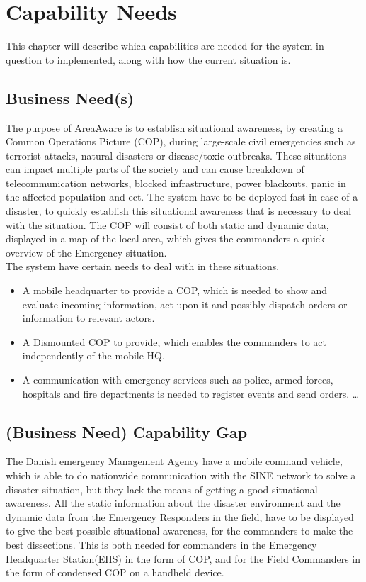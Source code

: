 \chapter{Capability Needs}
\label{chp_need}

This chapter will describe which capabilities are needed for the system in question to implemented, along with how the current situation is.

\section{Business Need(s)}

The purpose of AreaAware is to establish situational awareness, by creating a Common Operations Picture (COP), during large-scale civil emergencies such as terrorist attacks, natural disasters or disease/toxic outbreaks. These situations can impact multiple parts of the society and can cause breakdown of telecommunication networks, blocked infrastructure, power blackouts, panic in the affected population and ect. The system have to be deployed fast in case of a disaster, to quickly establish this situational awareness that is necessary to deal with the situation. The COP will consist of both static and dynamic data, displayed in a map of the local area, which gives the commanders a quick overview of the Emergency situation. \\

The system have certain needs to deal with in these situations.

\begin{itemize}
  \item A mobile headquarter to provide a COP, which is needed to show and evaluate incoming information, act upon it and possibly dispatch orders or information to relevant actors.
  \item A Dismounted COP to provide, which enables the commanders to act independently of the mobile HQ.
  \item A communication with emergency services such as police, armed forces, hospitals and fire departments is needed to register events and send orders. \ldots
\end{itemize}

\section{(Business Need) Capability Gap}

The Danish emergency Management Agency have a mobile command vehicle, which is able to do nationwide communication with the SINE network to solve a disaster situation, but they lack the means of getting a good situational awareness. All the static information about the disaster environment and the dynamic data from the Emergency Responders in the field, have to be displayed to give the best possible situational awareness, for the commanders to make the best dissections. This is both needed for commanders in the Emergency Headquarter Station(EHS) in the form of COP, and for the Field Commanders in the form of condensed COP on a handheld device.

